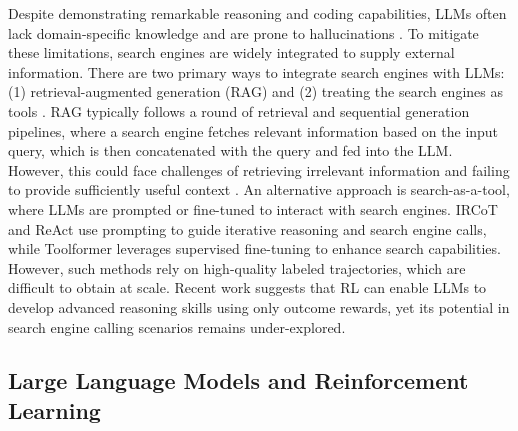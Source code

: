 Despite demonstrating remarkable reasoning \citep{guo2025deepseek} and coding \citep{guo2024deepseek} capabilities, LLMs \citep{zhao2023survey, team2024gemini, achiam2023gpt} often lack domain-specific knowledge \citep{peng2023study,li2023large} and are prone to hallucinations \citep{zhang2023siren}. To mitigate these limitations, search engines \citep{zhao2024dense} are widely integrated to supply external information.
There are two primary ways to integrate search engines with LLMs: (1) retrieval-augmented generation (RAG) \citep{gao2023retrieval} and (2) treating the search engines as tools \citep{schick2023toolformer}. RAG \citep{lewis2020retrieval, yue2024inference, xiong2025rag} typically follows a round of retrieval and sequential generation pipelines, where a search engine fetches relevant information based on the input query, which is then concatenated with the query and fed into the LLM. However, this could face challenges of retrieving irrelevant information \citep{jin2024long} and failing to provide sufficiently useful context \citep{jiang2023active}.
An alternative approach is search-as-a-tool, where LLMs are prompted or fine-tuned to interact with search engines. IRCoT \citep{trivedi2022interleaving} and ReAct \citep{yao2023react} use prompting to guide iterative reasoning and search engine calls, while Toolformer \citep{schick2023toolformer} leverages supervised fine-tuning to enhance search capabilities. However, such methods rely on high-quality labeled trajectories, which are difficult to obtain at scale. Recent work \citep{guo2025deepseek} suggests that RL can enable LLMs to develop advanced reasoning skills using only outcome rewards, yet its potential in search engine calling scenarios remains under-explored.

\subsection{Large Language Models and Reinforcement Learning}

